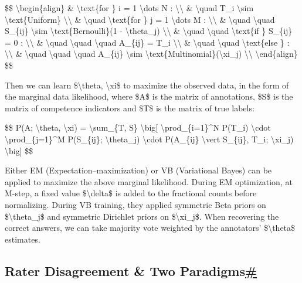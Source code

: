 \$\$ \textbackslash begin\{align\} \& \textbackslash text\{for \} i = 1 \textbackslash dots N : \textbackslash\textbackslash{} \& \textbackslash quad T\_i \textbackslash sim \textbackslash text\{Uniform\} \textbackslash\textbackslash{} \& \textbackslash quad \textbackslash text\{for \} j = 1 \textbackslash dots M : \textbackslash\textbackslash{} \& \textbackslash quad \textbackslash quad S\_\{ij\} \textbackslash sim \textbackslash text\{Bernoulli\}(1 - \textbackslash theta\_j) \textbackslash\textbackslash{} \& \textbackslash quad \textbackslash quad \textbackslash text\{if \} S\_\{ij\} = 0 : \textbackslash\textbackslash{} \& \textbackslash quad \textbackslash quad \textbackslash quad A\_\{ij\} = T\_i \textbackslash\textbackslash{} \& \textbackslash quad \textbackslash quad \textbackslash text\{else \} : \textbackslash\textbackslash{} \& \textbackslash quad \textbackslash quad \textbackslash quad A\_\{ij\} \textbackslash sim \textbackslash text\{Multinomial\}(\textbackslash xi\_j) \textbackslash\textbackslash{} \textbackslash end\{align\} \$\$

Then we can learn \$\textbackslash theta, \textbackslash xi\$ to maximize the observed data, in the form of the marginal data likelihood, where \$A\$ is the matrix of annotations, \$S\$ is the matrix of competence indicators and \$T\$ is the matrix of true labels:

\$\$ P(A; \textbackslash theta, \textbackslash xi) = \textbackslash sum\_\{T, S\} \textbackslash big{[} \textbackslash prod\_\{i=1\}\^{}N P(T\_i) \textbackslash cdot \textbackslash prod\_\{j=1\}\^{}M P(S\_\{ij\}; \textbackslash theta\_j) \textbackslash cdot P(A\_\{ij\} \textbackslash vert S\_\{ij\}, T\_i; \textbackslash xi\_j) \textbackslash big{]} \$\$

Either EM (Expectation--maximization) or VB (Variational Bayes) can be applied to maximize the above marginal likelihood. During EM optimization, at M-step, a fixed value \$\textbackslash delta\$ is added to the fractional counts before normalizing. During VB training, they applied symmetric Beta priors on \$\textbackslash theta\_j\$ and symmetric Dirichlet priors on \$\textbackslash xi\_j\$. When recovering the correct answers, we can take majority vote weighted by the annotators' \$\textbackslash theta\$ estimates.

\subsection{\texorpdfstring{Rater Disagreement \& Two Paradigms\hyperref[rater-disagreement--two-paradigms]{\#}}{Rater Disagreement \& Two Paradigms\#}}\label{rater-disagreement--two-paradigms}

